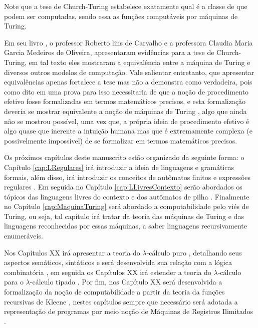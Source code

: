 \begin{rema}
	Note que a tese de Church-Turing estabelece exatamente qual é a classe de que podem ser computadas, sendo essa as funções computáveis por máquinas de Turing.
\end{rema}

Em seu livro \cite{roberto1998}, o professor Roberto lins de Carvalho e a professora Claudia Maria Garcia Medeiros de Oliveira, apresentaram evidências para a tese de Church-Turing, em tal texto eles mostraram a equivalência entre a máquina de Turing e diversos outros modelos de computação. Vale salientar entretanto, que apresentar equivalências apenas fortalece a tese mas não a demonstra como verdadeira, pois como dito em \cite{benjaLivro2010, roberto1998, sernadas2006} uma prova para isso necessitaria de que a noção de procedimento efetivo fosse formalizadas em termos matemáticos precisos, e esta formalização deveria se mostrar equivalente a noção de máquinas de Turing \cite{benjaLivro2010}, algo que ainda não se mostrou possível, uma vez que, a própria ideia de procedimento efetivo é algo quase que inerente a intuição humana mas que é extremamente complexa (e possivelmente impossível) de se formalizar em termos matemáticos precisos.

Os próximos capítulos deste manuscrito estão organizado da seguinte forma: o Capítulo \ref{cap:LRegulares} irá introduzir a ideia de linguagens e gramáticas formais, além disso, irá introduzir os conceitos de autômatos finitos e expressões regulares \cite{benjaLivro2010, hopcroft2008, linz2006}. Em seguida no Capítulo \ref{cap:LLivresContexto} serão abordados os tópicos das linguagens livres do contexto e dos autômatos de pilha \cite{benjaLivro2010, menezes1998LFA}. Finalmente no Capítulo \ref{cap:MaquinaTuring} será abordado a computabilidade pelo viés de Turing, ou seja, tal capítulo irá tratar da teoria das máquinas de Turing \cite{benjaLivro2010, menezes1998LFA, turing1937} e das linguagens reconhecidas por essas máquinas, a saber linguagens recursivamente enumeráveis. 

Nos Capítulos XX irá apresentar a teoria do $\lambda$-cálculo puro \cite{bare1984, henk1992, hankin2004}, detalhando seus aspectos semáticos, sintáticos e será desenvolvida sua relação com a lógica combinatória \cite{bimbo2019, hankin2004}, em seguida os Capítulos XX irá estender a teoria do $\lambda$-cálculo para o $\lambda$-cálculo tipado \cite{henk1992, hankin2004}. Por fim, nos Capítulo XX será desenvolvida a formalização da noção de computabilidade a partir da teoria da funções recursivas de Kleene \cite{kleene1936}, nestes capítulos sempre que necessário será adotada a representação de programas por meio noção de Máquinas de Registros Ilimitados \cite{cutland1980, menezes2003}. 

